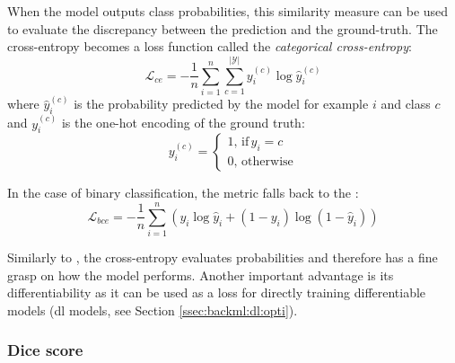 When the model outputs class probabilities, this similarity measure can be used
to evaluate the discrepancy between the prediction and the ground-truth. The
cross-entropy becomes a loss function called the
\textit{categorical cross-entropy}:
\begin{equation}
\label{eqn:backml:crossentropyloss}
\mathcal{L}_{ce} = - \frac{1}{n} \sum\limits_{i=1}^n \sum\limits_{c=1}^{\left|\mathcal{Y}\right|} y^{(c)}_{i} \log \hat{y}^{(c)}_i
\end{equation}
where $\hat{y}^{(c)}_i$ is the probability predicted by the model for example $i$
and class $c$ and $y^{(c)}_i$ is the one-hot encoding of the ground truth:
\begin{equation}
\label{eqn:backml:onehotencoding}
y^{(c)}_i =
\begin{cases}
1,\,\text{if}\, y_i = c \\
0,\,\text{otherwise}
\end{cases}
\end{equation}

In the case of binary classification, the metric falls back to the
:
\begin{equation}
\label{eqn:backml:bce}
\mathcal{L}_{bce} = - \frac{1}{n} \sum\limits_{i=1}^n \left(y_i \log \hat{y}_i + (1 - y_i) \log (1 - \hat{y}_i)\right)
\end{equation}

Similarly to \rocauc, the cross-entropy evaluates probabilities and therefore has
a fine grasp on how the model performs. Another important advantage is its
differentiability as it can be used as a loss for directly training differentiable
models (\eg \acrlong{dl} models, see Section \ref{ssec:backml:dl:opti}).

\subsubsection{Dice score}
\label{sssec:backml:metric:dice}

